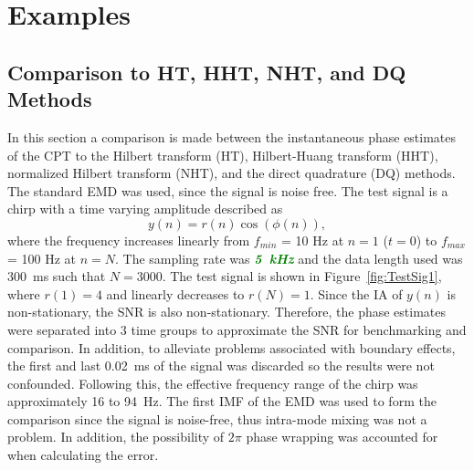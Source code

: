 \documentclass[a4paper]{IEEEtran}
\newcommand{\dean}[1]{\textsf{\emph{\textbf{\textcolor{green}{#1}}}}}
\begin{document}
% 



\section{Examples}
\subsection{Comparison to HT, HHT, NHT, and DQ Methods}
In this section a comparison is made between the instantaneous phase estimates of the CPT to the Hilbert transform (HT), Hilbert-Huang transform (HHT), normalized Hilbert transform (NHT), and the direct quadrature (DQ) methods. The standard EMD was used, since the signal is noise free. The test signal is a chirp with a time varying amplitude described as
\begin{equation}\label{TestSigNoNoise}
    y(n)=r\left(n\right)\cos\left(\phi\left(n\right)\right),
\end{equation}
where the frequency increases linearly from $f_{min}$ = 10 Hz at $n=1$ ($t=0$) to $f_{max}$ = 100 Hz at $n=N$. The sampling rate was \dean{5~kHz} and the data length used was 300~ms such that $N = 3000$. The test signal is shown in Figure~\ref{fig:TestSig1}, where $r(1) = 4$ and linearly decreases to $r(N) = 1$. Since the IA of $y(n)$ is non-stationary, the SNR is also non-stationary. Therefore, the phase estimates were separated into $3$ time groups to approximate the SNR for benchmarking and comparison. In addition, to alleviate problems associated with boundary effects, the first and last 0.02~ms of the signal was discarded so the results were not confounded. Following this, the effective frequency range of the chirp was approximately 16 to 94~Hz. The first IMF of the EMD was used to form the comparison since the signal is noise-free, thus intra-mode mixing was not a problem. In addition, the possibility of $2\pi$ phase wrapping was accounted for when calculating the error.
\end{document}
